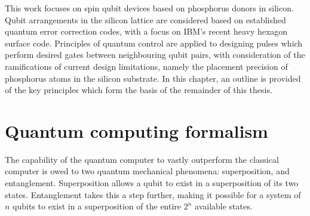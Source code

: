 \documentclass[../Thesis.tex]{subfiles}
\begin{document}




This work focuses on spin qubit devices based on phosphorus donors in silicon. Qubit arrangements in the silicon lattice are considered based on established quantum error correction codes, with a focus on IBM's recent heavy hexagon surface code\cite{chamberland_topological_2020}. Principles of quantum control are applied to designing pulses which perform desired gates between neighbouring qubit pairs, with consideration of the ramifications of current design limitations, namely the placement precision of phosphorus atoms in the silicon substrate\cite{pla_single-atom_2012}. In this chapter, an outline is provided of the key principles which form the basis of the remainder of this thesis.

\section{Quantum computing formalism}

The capability of the quantum computer to vastly outperform the classical computer is owed to two quantum mechanical phenomena: superposition, and entanglement. Superposition allows a qubit to exist in a superposition of its two states. Entanglement takes this a step further, making it possible for a system of $n$ qubits to exist in a superposition of the entire $2^n$ available states. 
\end{document}
